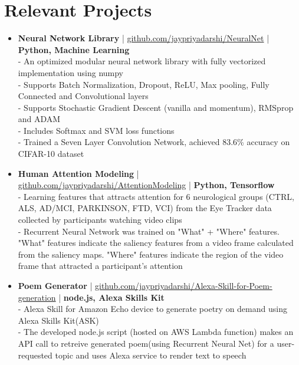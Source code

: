 \section{Relevant Projects}
\begin{itemize}
 \item \textbf{Neural Network Library} | \href{https://github.com/jaypriyadarshi/NeuralNet}{github.com/jaypriyadarshi/NeuralNet} | \textbf{Python, Machine Learning}\\
 - An optimized modular neural network library with fully vectorized implementation using numpy\\
 - Supports Batch Normalization, Dropout, ReLU, Max pooling, Fully Connected and Convolutional layers\\
 - Supports Stochastic Gradient Descent (vanilla and momentum), RMSprop and ADAM\\
 - Includes Softmax and SVM loss functions\\
 - Trained a Seven Layer Convolution Network, achieved 83.6\% accuracy on CIFAR-10 dataset 

\item \textbf{Human Attention Modeling} | \href{https://github.com/jaypriyadarshi/AttentionModeling}{github.com/jaypriyadarshi/AttentionModeling} | \textbf{Python, Tensorflow}\\
 - Learning features that attracts attention for 6 neurological groups (CTRL, ALS, AD/MCI, PARKINSON, FTD, VCI) from the Eye Tracker data collected by participants watching video clips\\
 - Recurrent Neural Network was trained on "What" + "Where" features. "What" features indicate the saliency features from a video frame calculated from the saliency maps. "Where" features indicate the region of the video frame that attracted a participant's attention
 
\item \textbf{Poem Generator} | \href{https://github.com/jaypriyadarshi/Alexa-Skill-for-Poem-generation}{github.com/jaypriyadarshi/Alexa-Skill-for-Poem-generation} | \textbf{node.js, Alexa Skills Kit}\\
 - Alexa Skill for Amazon Echo device to generate poetry on demand using Alexa Skills Kit(ASK)\\
 - The developed node.js script (hosted on AWS Lambda function) makes an API call to retreive generated poem(using Recurrent Neural Net) for a user-requested topic and uses Alexa service to render text to speech

\end{itemize}
\vspace{5pt}
